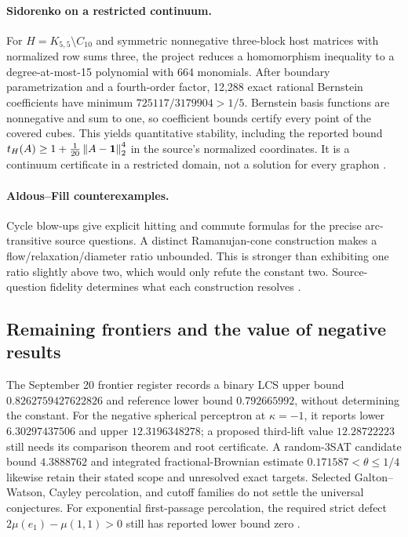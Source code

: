 \paragraph{Sidorenko on a restricted continuum.}
For $H=K_{5,5}\setminus C_{10}$ and symmetric nonnegative three-block host matrices with normalized row sums three, the project reduces a homomorphism inequality to a degree-at-most-15 polynomial with 664 monomials. After boundary parametrization and a fourth-order factor, 12,288 exact rational Bernstein coefficients have minimum $725117/3179904>1/5$. Bernstein basis functions are nonnegative and sum to one, so coefficient bounds certify every point of the covered cubes. This yields quantitative stability, including the reported bound $t_H(A)\geq1+\frac1{20}\left\lVert A-\mathbf1\right\rVert_2^4$ in the source's normalized coordinates. It is a continuum certificate in a restricted domain, not a solution for every graphon \citep{CaseSidorenko2026}.

\paragraph{Aldous--Fill counterexamples.}
Cycle blow-ups give explicit hitting and commute formulas for the precise arc-transitive source questions. A distinct Ramanujan-cone construction makes a flow/relaxation/diameter ratio unbounded. This is stronger than exhibiting one ratio slightly above two, which would only refute the constant two. Source-question fidelity determines what each construction resolves \citep{AldousFillBook,CaseArcTransitive2026,CaseFlowDiameter2026}.

\subsection{Remaining frontiers and the value of negative results}

The September 20 frontier register records a binary LCS upper bound $0.8262759427622826$ and reference lower bound $0.792665992$, without determining the constant. For the negative spherical perceptron at $\kappa=-1$, it reports lower $6.30297437506$ and upper $12.3196348278$; a proposed third-lift value $12.28722223$ still needs its comparison theorem and root certificate. A random-3SAT candidate bound $4.3888762$ and integrated fractional-Brownian estimate $0.171587<\theta\leq1/4$ likewise retain their stated scope and unresolved exact targets. Selected Galton--Watson, Cayley percolation, and cutoff families do not settle the universal conjectures. For exponential first-passage percolation, the required strict defect $2\mu(e_1)-\mu(1,1)>0$ still has reported lower bound zero \citep{CaseComputeStrategy2026,CaseProgress2026}.

